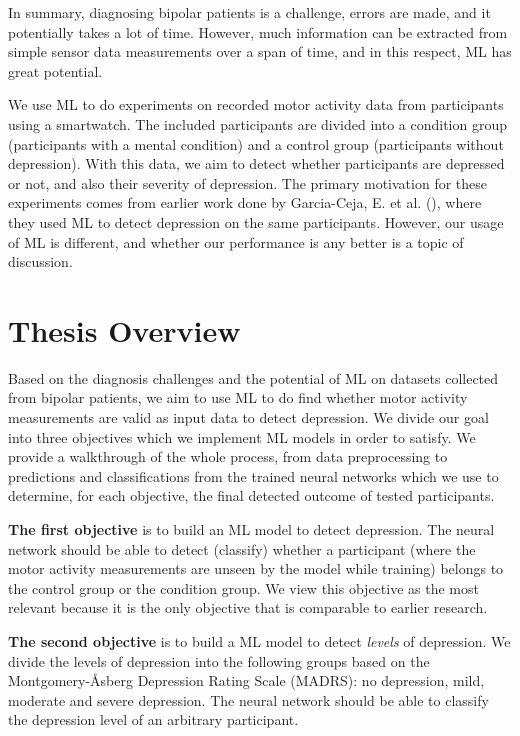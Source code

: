 In summary, diagnosing bipolar patients is a challenge, errors are made, and it potentially takes a lot of time. However, much information can be extracted from simple sensor data measurements over a span of time, and in this respect, ML has great potential. 

We use ML to do experiments on recorded motor activity data from participants using a smartwatch. The included participants are divided into a condition group (participants with a mental condition) and a control group (participants without depression). With this data, we aim to detect whether participants are depressed or not, and also their severity of depression. The primary motivation for these experiments comes from earlier work done by Garcia-Ceja, E. et al. (\cite{GarciaCeja2018_classification_bipolar}), where they used ML to detect depression on the same participants. However, our usage of ML is different, and whether our performance is any better is a topic of discussion.

\section{Thesis Overview}
Based on the diagnosis challenges and the potential of ML on datasets collected from bipolar patients, we aim to use ML to do find whether motor activity measurements are valid as input data to detect depression. We divide our goal into three objectives which we implement ML models in order to satisfy. We provide a walkthrough of the whole process, from data preprocessing to predictions and classifications from the trained neural networks which we use to determine, for each objective, the final detected outcome of tested participants.

\textbf{The first objective} is to build an ML model to detect depression. The neural network should be able to detect (classify) whether a participant (where the motor activity measurements are unseen by the model while training) belongs to the control group or the condition group. We view this objective as the most relevant because it is the only objective that is comparable to earlier research.

\textbf{The second objective} is to build a ML model to detect \textit{levels} of depression. We divide the levels of depression into the following groups based on the Montgomery-Åsberg Depression Rating Scale (MADRS): no depression, mild, moderate and severe depression. The neural network should be able to classify the depression level of an arbitrary participant.


